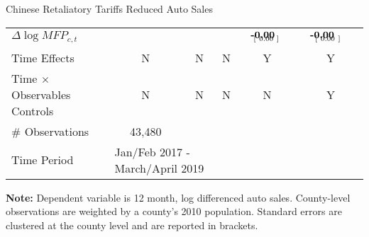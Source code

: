 \documentclass[9pt,pdftex,aspectratio=1610]{beamer}
\theoremstyle{definition}
\begin{document}
\begin{frame}[t]{Chinese Retaliatory Tariffs Reduced Auto Sales}
\begin{table}[t]
\begin{center}
\begin{tabular}{l c c c c c}
$\Delta \log MFP_{c,t}$
&
&
&
& $\begin{array}{c}\textbf{-0.00}\phantom{^{**}}  \vspace{-.32cm}\\ \scriptstyle \phantom{-}[ \ 0.00 \ ]\phantom{^{**}} \end{array}$
& $\begin{array}{c}\textbf{-0.00 }\phantom{^{***}} \vspace{-.32cm}\\ \scriptstyle \phantom{-}[ \ 0.00 \ ]\phantom{^{***}} \end{array}$\\

Time Effects            &N & N  & N & Y & Y\\
Time $\times$ Observables Controls    &N & N  & N & N & Y \\
\hline
\# Observations & 43,480 \\
Time Period & \multicolumn{2}{l}{Jan/Feb 2017 - March/April 2019}\\
\hline
\end{tabular}
\parbox[c]{4.75in}{\vspace{.1cm}
{\footnotesize \textbf{Note:} Dependent variable is 12 month, log differenced auto sales. County-level observations are weighted by a county's 2010 population. Standard errors are clustered at the county level and are reported in brackets.}}
\end{center}
\end{table}
\end{frame}

\end{document}

